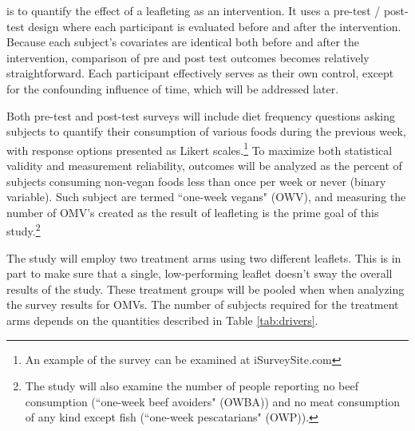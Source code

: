 \documentclass{tufte-handout}
\newcommand{\les}[0]{\textsc{LES}}%
\begin{document}
 is to quantify the effect of a leafleting
as an intervention. It uses a pre-test / post-test design where each participant 
is evaluated before and after the intervention. Because each subject's 
covariates are identical both before and after the intervention, comparison 
of pre and post test outcomes becomes relatively straightforward. 
Each participant effectively serves as their own control, except for the
confounding influence of time, which will be addressed later. 

Both pre-test and post-test surveys will include diet frequency questions 
asking subjects to quantify their consumption of various foods during the 
previous week, with response options presented as Likert scales.\footnote{An example
of the survey can be examined at iSurveySite.com} To maximize both statistical 
validity and measurement reliability, outcomes will be analyzed as the 
percent of subjects consuming non-vegan foods less than once per week or 
never (binary variable). Such subject are termed ``one-week vegans" (OWV), and 
measuring the number of OMV's created as the result of leafleting 
is the prime goal of this study.\footnote{The study will also examine the
number of people reporting no beef consumption (``one-week beef avoiders" (OWBA)) 
and no meat consumption of any kind except fish (``one-week pescatarians" (OWP)).}

The study will employ two treatment arms using two different leaflets. This is
in part to make sure that a single, low-performing leaflet doesn't sway the 
overall results of the study. These treatment groups will be pooled when 
when analyzing the survey results for OMVs. The number of subjects
required for the treatment arms depends on the quantities described in Table
\ref{tab:drivers}.

\end{document}
